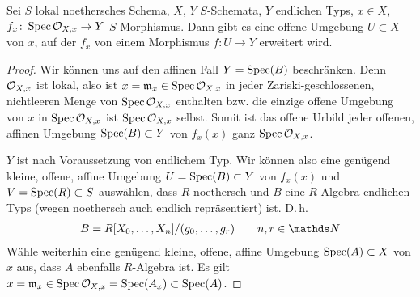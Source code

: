 \documentclass[german]{scrreprt}
\begin{document}
\begin{Lemma}\label{thm:morphismuserweiterung}
  \cite[Exercise 3.2.4]{liu}
  Sei $S$ lokal noethersches Schema, $X$, $Y$ $S$-Schemata, $Y$
  endlichen Typs, $x\in X$, $f_x\colon \operatorname{Spec}\mathcal{O}_{X,x}\to Y$
  $S$-Morphismus.
  Dann gibt es eine offene Umgebung $U\subset X$ von $x$, auf der
  $f_x$ von einem Morphismus $f\colon U\to Y$ erweitert wird.
  \begin{proof}
    Wir können uns auf den affinen Fall $Y=\operatorname{Spec}(B)$ beschränken.
    Denn $\mathcal{O}_{X,x}$ ist lokal, also ist $x=\mathfrak{m}_x\in\operatorname{Spec}\mathcal{O}_{X,x}$ in jeder
    Zariski-geschlossenen, nichtleeren Menge von $\operatorname{Spec}\mathcal{O}_{X,x}$
    enthalten bzw. die einzige offene Umgebung von $x$ in
    $\operatorname{Spec}\mathcal{O}_{X,x}$ ist $\operatorname{Spec}\mathcal{O}_{X,x}$ selbst.
    Somit ist das offene Urbild jeder offenen, affinen Umgebung
    $\operatorname{Spec}(B)\subset Y$ von $f_x(x)$ ganz $\operatorname{Spec}\mathcal{O}_{X,x}$.

    $Y$ ist nach Voraussetzung von endlichem Typ.
    Wir können also eine genügend kleine, offene, affine Umgebung
    $U=\operatorname{Spec}(B)\subset Y$ von $f_x(x)$ und $V=\operatorname{Spec}(R)\subset S$ auswählen,
    dass $R$ noethersch und $B$ eine $R$-Algebra endlichen Typs (wegen
    noethersch auch endlich repräsentiert) ist. D.\,h.
    \begin{gather*}
      B=R[X_0,\dotsc, X_n]/(g_0,\dotsc, g_r)\qquad n,r\in\N
    \end{gather*}
    Wähle weiterhin eine genügend kleine, offene, affine Umgebung
    $\operatorname{Spec}(A)\subset X$ von $x$ aus, dass $A$ ebenfalls $R$-Algebra ist.
    Es gilt $x=\mathfrak{m}_x\in\operatorname{Spec}\mathcal{O}_{X,x}=\operatorname{Spec}(A_x)\subset\operatorname{Spec}(A)$.
    

\end{proof}
\end{Lemma}
\end{document}
